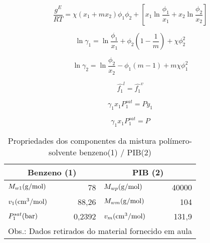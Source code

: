 \begin{equation}
\frac{g^E}{RT} = \chi\left(x_1 + mx_2\right)\phi_1\phi_2 +
\left[x_1\ln\frac{\phi_1}{x_1} + x_2\ln\frac{\phi_2}{x_2}\right]
\end{equation}

\begin{equation}
\ln\gamma_1 = \ln\frac{\phi_1}{x_1} + \phi_2\left( 1 - \frac{1}{m} \right) +
\chi\phi_2^2
\end{equation}

\begin{equation}
\ln\gamma_2 = \ln\frac{\phi_2}{x_2} - \phi_1\left( m - 1 \right) +
m\chi\phi_1^2
\end{equation}


\begin{equation}
\hat{f_1}^l = \hat{f_1}^v
\end{equation}

\begin{equation}
\gamma_1x_1P_1^{sat} = Py_1
\end{equation}

\begin{equation}
\gamma_1x_1P_1^{sat} = P
\end{equation}

\begin{table}[htb]
\renewcommand{\arraystretch}{1.3}
\caption{Propriedades dos componentes da mistura polímero-solvente benzeno(1) /
PIB(2)}
\footnotesize
\center
\begin{tabular}{lr|lr}
\toprule
\multicolumn{2}{c}{Benzeno (1)}	&	\multicolumn{2}{c}{PIB (2)}		\\
\midrule 
{$M_{w1}\rm{ (g/mol)}$} 	&	{78}	&	{$M_{wp}\rm{ (g/mol)}$}	&	{40000}	\\
{$v_1\rm{ (cm^3/mol)}$}	&	{88,26}	&	{$M_{wm} \rm{ (g/mol)}$}	&	{104}	\\
{$P_1^{sat}\rm{ (bar)}$}	&	{0,2392}	&	{$v_m \rm{ (cm^3/mol)}$}	&	{131,9}	\\

\bottomrule
\multicolumn{4}{c}{Obs.: Dados retirados do material fornecido em aula}
\end{tabular}
\label{tab:dexp1}
\end{table}

